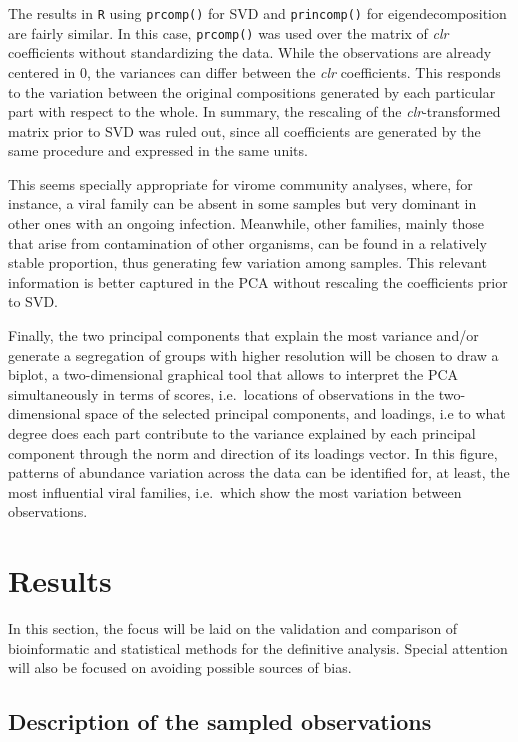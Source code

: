 \documentclass[
  openany]{book}
\begin{document}
The results in \texttt{R} using \texttt{prcomp()} for SVD and \texttt{princomp()} for eigendecomposition are fairly similar. In this case, \texttt{prcomp()} was used over the matrix of \emph{clr} coefficients without standardizing the data. While the observations are already centered in 0, the variances can differ between the \emph{clr} coefficients. This responds to the variation between the original compositions generated by each particular part with respect to the whole. In summary, the rescaling of the \emph{clr}-transformed matrix prior to SVD was ruled out, since all coefficients are generated by the same procedure and expressed in the same units.

This seems specially appropriate for virome community analyses, where, for instance, a viral family can be absent in some samples but very dominant in other ones with an ongoing infection. Meanwhile, other families, mainly those that arise from contamination of other organisms, can be found in a relatively stable proportion, thus generating few variation among samples. This relevant information is better captured in the PCA without rescaling the coefficients prior to SVD.

Finally, the two principal components that explain the most variance and/or generate a segregation of groups with higher resolution will be chosen to draw a biplot, a two-dimensional graphical tool that allows to interpret the PCA simultaneously in terms of scores, i.e.~locations of observations in the two-dimensional space of the selected principal components, and loadings, i.e to what degree does each part contribute to the variance explained by each principal component through the norm and direction of its loadings vector. In this figure, patterns of abundance variation across the data can be identified for, at least, the most influential viral families, i.e.~which show the most variation between observations.

\hypertarget{results}{%
\section{Results}\label{results}}

In this section, the focus will be laid on the validation and comparison of bioinformatic and statistical methods for the definitive analysis. Special attention will also be focused on avoiding possible sources of bias.

\hypertarget{description-of-the-sampled-observations}{%
\subsection{Description of the sampled observations}\label{description-of-the-sampled-observations}}
\end{document}
